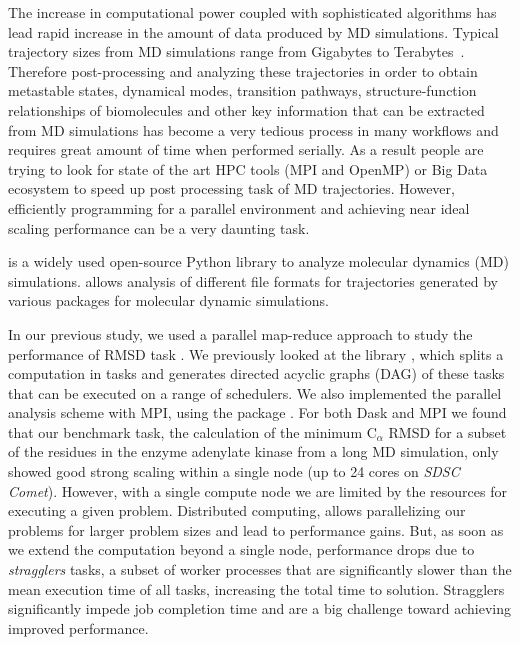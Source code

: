 \label{sec:introduction}
The increase in computational power coupled with sophisticated algorithms has lead rapid increase in the amount of data produced by MD simulations. 
Typical trajectory sizes from MD simulations range from Gigabytes to Terabytes~\cite{Cheatham:2015}. 
Therefore post-processing and analyzing these trajectories in order to obtain metastable states, dynamical modes, transition pathways, structure-function relationships of biomolecules and other key information that can be extracted from MD simulations has become a very tedious process in many workflows and requires great amount of time when performed serially. 
As a result people are trying to look for state of the art HPC tools (MPI and OpenMP) or Big Data ecosystem to speed up post processing task of MD trajectories.
 
However, efficiently programming for a parallel environment and achieving near ideal scaling performance can be a very daunting task. 

 \citep{Gowers:2016aa,Michaud-Agrawal:2011fu} is a widely used open-source Python library to analyze molecular dynamics (MD) simulations. 
 allows analysis of different file formats for trajectories generated by various packages for molecular dynamic simulations. 

In our previous study, we used a parallel map-reduce approach to study the performance of RMSD task \cite{Khoshlessan:2017ab, ICCP-2018}. 
We previously looked at the  library \cite{Rocklin:2015aa}, which splits a computation in tasks and generates directed acyclic graphs (DAG) of these tasks that can be executed on a range of schedulers. 
We also implemented the parallel analysis scheme with MPI, using the  package \cite{Dalcin:2011aa, Dalcin:2005aa}. 
For both Dask and MPI we found that our benchmark task, the calculation of the minimum C$_{\alpha}$ RMSD for a
subset of the residues in the enzyme adenylate kinase from a long MD simulation, only showed good strong scaling within a single node (up to 24 cores on \emph{SDSC Comet}).
However, with a single compute node we are limited by the resources for executing a given problem.
Distributed computing, allows parallelizing our problems for larger problem sizes and lead to performance gains.
But, as soon as we extend the computation beyond a single node, performance drops due to \emph{stragglers} tasks, a subset of worker processes that are significantly slower than the mean execution time of all tasks, increasing the total time to solution.
Stragglers significantly impede job completion time and are a big challenge toward achieving improved performance.

